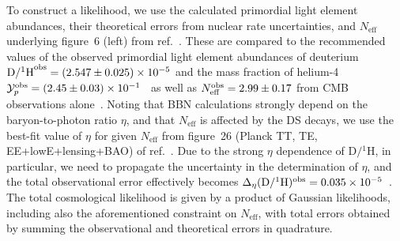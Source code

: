 	To construct a likelihood, we use the calculated primordial light element abundances, their theoretical errors from nuclear rate uncertainties, and $N_\text{eff}$ underlying figure~6 (left) from ref.~\cite{Depta:2020zbh}. These are compared to the recommended values of the observed primordial light element abundances of deuterium $\mathrm{D / {}^1H}^{\text{obs}} = (2.547 \pm 0.025) \times 10^{-5}$ and the mass fraction of helium-4 $\mathcal{Y}_p^{\text{obs}} = (2.45 \pm 0.03) \times 10^{-1}$~\cite{ParticleDataGroup:2022pth} as well as $N_\text{eff}^{\text{obs}} = 2.99 \pm 0.17$ from \ac{CMB} observations alone~\cite{Planck:2018vyg}. Noting  that \ac{BBN} calculations strongly depend on the baryon-to-photon ratio $\eta$,  and that $N_\text{eff}$ is affected by the DS decays, we use the best-fit value of $\eta$ for given $N_\text{eff}$ from figure~26 
	(Planck TT, TE, EE+lowE+lensing+BAO) of ref.~\cite{Planck:2018vyg}. Due to the strong $\eta$ dependence of $\mathrm{D / {}^1H}$, in particular,  we need to propagate the uncertainty in the determination of $\eta$, and the total observational error effectively becomes $\Delta_\eta({\mathrm{D / {}^1H}})^{\text{obs}} = 0.035 \times 10^{-5}$~\cite{Depta:2020zbh}. The total cosmological likelihood is given by a product of Gaussian likelihoods, including also the aforementioned constraint on $N_\text{eff}$, with total errors obtained by summing the observational and theoretical errors in quadrature.
	
